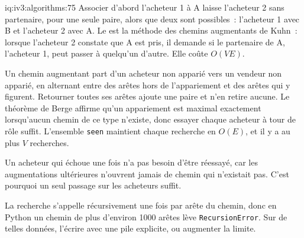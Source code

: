 \begin{solution}{iq:iv3:algorithms:75}
Associer d'abord l'acheteur 1 à A laisse l'acheteur 2 sans partenaire, pour une seule paire, alors que deux sont possibles~: l'acheteur 1 avec B et l'acheteur 2 avec A. Le  est la méthode des chemins augmentants de Kuhn~: lorsque l'acheteur 2 constate que A est pris, il demande si le partenaire de A, l'acheteur 1, peut passer à quelqu'un d'autre. Elle coûte $O(VE)$.
\label{lst:iv3:al:pairing}

Un chemin augmentant part d'un acheteur non apparié vers un vendeur non apparié, en alternant entre des arêtes hors de l'appariement et des arêtes qui y figurent. Retourner toutes ses arêtes ajoute une paire et n'en retire aucune. Le théorème de Berge affirme qu'un appariement est maximal exactement lorsqu'aucun chemin de ce type n'existe, donc essayer chaque acheteur à tour de rôle suffit. L'ensemble \texttt{seen} maintient chaque recherche en $O(E)$, et il y a au plus $V$ recherches.

Un acheteur qui échoue une fois n'a pas besoin d'être réessayé, car les augmentations ultérieures n'ouvrent jamais de chemin qui n'existait pas. C'est pourquoi un seul passage sur les acheteurs suffit.

La recherche s'appelle récursivement une fois par arête du chemin, donc en Python un chemin de plus d'environ 1000 arêtes lève \texttt{RecursionError}. Sur de telles données, l'écrire avec une pile explicite, ou augmenter la limite.

\end{solution}

